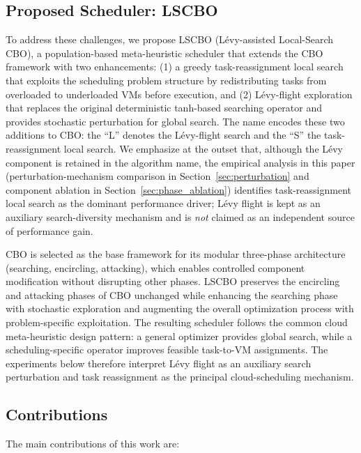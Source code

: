 \documentclass[pdflatex,onecolumn,sn-mathphys-num]{sn-jnl}
\begin{document}
\subsection{Proposed Scheduler: LSCBO}
To address these challenges, we propose LSCBO (L\'{e}vy-assisted Local-Search CBO), a population-based meta-heuristic scheduler that extends the CBO framework with two enhancements: (1) a greedy task-reassignment local search that exploits the scheduling problem structure by redistributing tasks from overloaded to underloaded VMs before execution, and (2) L\'{e}vy-flight exploration that replaces the original deterministic tanh-based searching operator and provides stochastic perturbation for global search. The name encodes these two additions to CBO: the ``L'' denotes the L\'{e}vy-flight search and the ``S'' the task-reassignment local search. We emphasize at the outset that, although the L\'{e}vy component is retained in the algorithm name, the empirical analysis in this paper (perturbation-mechanism comparison in Section~\ref{sec:perturbation} and component ablation in Section~\ref{sec:phase_ablation}) identifies task-reassignment local search as the dominant performance driver; L\'{e}vy flight is kept as an auxiliary search-diversity mechanism and is \emph{not} claimed as an independent source of performance gain.

CBO is selected as the base framework for its modular three-phase architecture (searching, encircling, attacking), which enables controlled component modification without disrupting other phases. LSCBO preserves the encircling and attacking phases of CBO unchanged while enhancing the searching phase with stochastic exploration and augmenting the overall optimization process with problem-specific exploitation. The resulting scheduler follows the common cloud meta-heuristic design pattern: a general optimizer provides global search, while a scheduling-specific operator improves feasible task-to-VM assignments. The experiments below therefore interpret L\'{e}vy flight as an auxiliary search perturbation and task reassignment as the principal cloud-scheduling mechanism.

\subsection{Contributions}
The main contributions of this work are:
\end{document}
